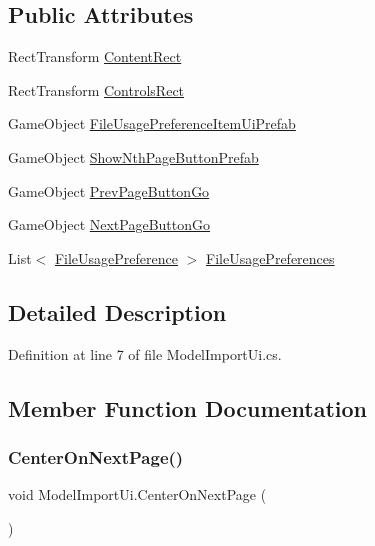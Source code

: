 \subsection*{Public Attributes}
\begin{DoxyCompactItemize}
\item 
Rect\+Transform \mbox{\hyperlink{class_model_import_ui_a5b275d728820d77f486a8bfe7b3dc3f2}{Content\+Rect}}
\item 
Rect\+Transform \mbox{\hyperlink{class_model_import_ui_a055ff2f78dafbee19346bb8b393f223a}{Controls\+Rect}}
\item 
Game\+Object \mbox{\hyperlink{class_model_import_ui_aa7ced6e944b3736ed16f88abfdb5b7a2}{File\+Usage\+Preference\+Item\+Ui\+Prefab}}
\item 
Game\+Object \mbox{\hyperlink{class_model_import_ui_a3b43e2001a2921b62cd56c7eda8881b6}{Show\+Nth\+Page\+Button\+Prefab}}
\item 
Game\+Object \mbox{\hyperlink{class_model_import_ui_a7d8183e6375e51d5ac52f0fe5526d95f}{Prev\+Page\+Button\+Go}}
\item 
Game\+Object \mbox{\hyperlink{class_model_import_ui_a8598a05c1c3f7317ffd9fefc771dab0f}{Next\+Page\+Button\+Go}}
\item 
List$<$ \mbox{\hyperlink{class_file_usage_preference}{File\+Usage\+Preference}} $>$ \mbox{\hyperlink{class_model_import_ui_a720330a11dc2f26d2e39e8c18ade9aff}{File\+Usage\+Preferences}}
\end{DoxyCompactItemize}


\subsection{Detailed Description}


Definition at line 7 of file Model\+Import\+Ui.\+cs.



\subsection{Member Function Documentation}
\mbox{\label{class_model_import_ui_aae15ee15a6833496236511ddf9caf8e3}} 
\subsubsection{\texorpdfstring{CenterOnNextPage()}{CenterOnNextPage()}}
{\footnotesize\ttfamily void Model\+Import\+Ui.\+Center\+On\+Next\+Page (\begin{DoxyParamCaption}{ }\end{DoxyParamCaption})}



